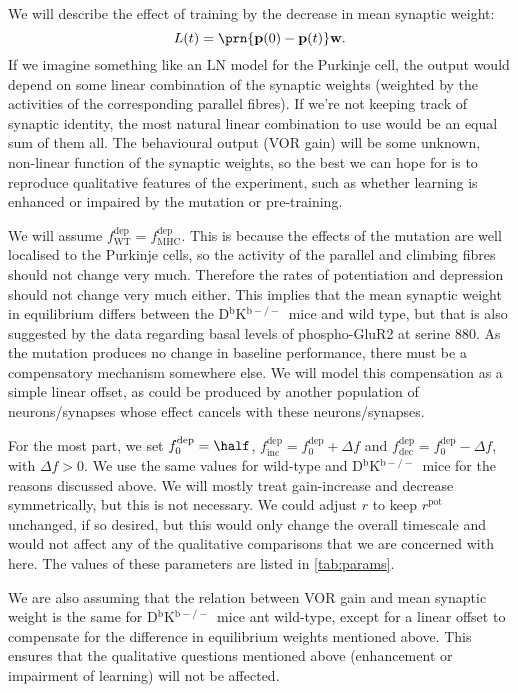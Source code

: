 \documentclass[12pt]{article}
\newcommand{\pr}{\mathbf{p}}
\newcommand{\w}{\mathbf{w}}
\newcommand{\pot}{^{\text{pot}}}
\newcommand{\dep}{^{\text{dep}}}
\newcommand{\norm}{_0}
\newcommand{\inc}{_{\text{inc}}}
\newcommand{\dec}{_{\text{dec}}}
\newcommand{\wt}{_{\text{WT}}}
\newcommand{\KO}{D$^\mathrm{b}$K$^{\mathrm{b}-/-}$}
\newcommand{\ko}{_{\text{MHC}}}
\begin{document}
We will describe the effect of training by the decrease in mean synaptic weight:
%
\begin{equation}\label{eq:learning}
  L(t) = \prn{\pr(0)-\pr(t)}\w.
\end{equation}
%
If we imagine something like an LN model for the Purkinje cell, the output would depend on some linear combination of the synaptic weights (weighted by the activities of the corresponding parallel fibres).
If we're not keeping track of synaptic identity, the most natural linear combination to use would be an equal sum of them all.
The behavioural output (VOR gain) will be some unknown, non-linear function of the synaptic weights, so the best we can hope for is to reproduce qualitative features of the experiment, such as whether learning is enhanced or impaired by the mutation or pre-training.

We will assume $f\dep\wt=f\dep\ko$.
This is because the effects of the mutation are well localised to the Purkinje cells, so the activity of the parallel and climbing fibres should not change very much.
Therefore the rates of potentiation and depression should not change very much either.
This implies that the mean synaptic weight in equilibrium differs between the \KO\ mice and wild type, but that is also suggested by the data regarding basal levels of phospho-GluR2 at serine 880.
As the mutation produces no change in baseline performance, there must be a compensatory mechanism somewhere else.
We will model this compensation as a simple linear offset, as could be produced by another population of neurons/synapses whose effect cancels with these neurons/synapses.

For the most part, we set $f\dep\norm=\half$, $f\dep\inc=f\dep\norm+\Delta f$ and $f\dep\dec=f\dep\norm-\Delta f$, with $\Delta f>0$.
We use the same values for wild-type and \KO\ mice for the reasons discussed above.
We will mostly treat gain-increase and decrease symmetrically, but this is not necessary.
We could adjust $r$ to keep $r\pot$ unchanged, if so desired, but this would only change the overall timescale and would not affect any of the qualitative comparisons that we are concerned with here.
The values of these parameters are listed in \autoref{tab:params}.

We are also assuming that the relation between VOR gain and mean synaptic weight is the same for \KO\ mice ant wild-type, except for a linear offset to compensate for the difference in equilibrium weights mentioned above.
This ensures that the qualitative questions mentioned above (enhancement or impairment of learning) will not be affected.
\end{document}
